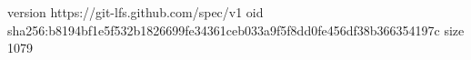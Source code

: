 version https://git-lfs.github.com/spec/v1
oid sha256:b8194bf1e5f532b1826699fe34361ceb033a9f5f8dd0fe456df38b366354197c
size 1079
